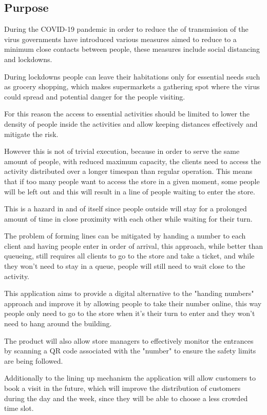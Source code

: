 \subsection{Purpose}

During the COVID-19 pandemic in order to reduce the of transmission of the virus governments have introduced various measures aimed to reduce to a minimum close contacts between people, these measures include social distancing and lockdowns.

During lockdowns people can leave their habitations only for essential needs such as grocery shopping, which makes supermarkets a gathering spot where the virus could spread and potential danger for the people visiting.

For this reason the access to essential activities should be limited to lower the density of people inside the activities and allow keeping distances effectively and mitigate the risk.

However this is not of trivial execution, because in order to serve the same amount of people, with reduced maximum capacity, the clients need to access the activity distributed over a longer timespan than regular operation. This means that if too many people want to access the store in a given moment, some people will be left out and this will result in a line of people waiting to enter the store.

This is a hazard in and of itself since people outside will stay for a prolonged amount of time in close proximity with each other while waiting for their turn.

The problem of forming lines can be mitigated by handing a number to each client and having people enter in order of arrival, this approach, while better than queueing, still requires all clients to go to the store and take a ticket, and while they won't need to stay in a queue, people will still need to wait close to the activity.

This application aims to provide a digital alternative to the "handing numbers" approach and improve it by allowing people to take their number online, this way people only need to go to the store when it's their turn to enter and they won't need to hang around the building.

The product will also allow store managers to effectively monitor the entrances by scanning a QR code associated with the "number" to ensure the safety limits are being followed.

Additionally to the lining up mechanism the application will allow customers to book a visit in the future, which will improve the distribution of customers during the day and the week, since they will be able to choose a less crowded time slot.

